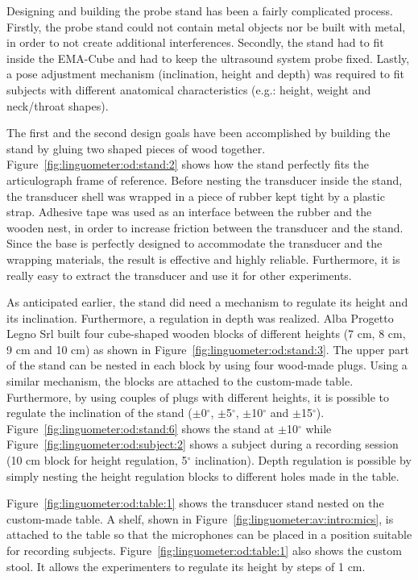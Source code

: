 Designing and building the probe stand has been a fairly complicated process. 
Firstly, the probe stand could not contain metal objects nor be
built with metal, in order to not create additional interferences.
Secondly, the stand had to fit inside the EMA-Cube and had to keep the
ultrasound system probe fixed. 
Lastly, a pose adjustment mechanism 
(inclination, height and depth) was required to
fit subjects with different anatomical characteristics (e.g.: height, weight and
neck/throat shapes).


The first and the second design goals have been accomplished by building the 
stand by gluing two shaped pieces of wood together.
Figure~\ref{fig:linguometer:od:stand:2} shows how the stand perfectly fits the 
articulograph frame of reference. 
Before nesting the transducer inside the stand, the transducer shell was wrapped
in a piece of rubber kept tight by a plastic strap. 
Adhesive tape was used as an interface between the rubber and the
wooden nest, in order to increase friction between the transducer and the
stand.
Since the base is perfectly designed to accommodate the transducer and the
wrapping materials, the result is effective and highly reliable. 
Furthermore, it is really easy to extract the transducer and use it for other
experiments.

As anticipated earlier, the stand did need a mechanism to regulate its height
and its inclination. Furthermore, a regulation in depth was realized.
Alba Progetto Legno Srl built four cube-shaped wooden blocks of different
heights (7 cm, 8 cm, 9 cm and 10 cm) as shown in
Figure~\ref{fig:linguometer:od:stand:3}.
The upper part of the stand can be nested in each block by using four wood-made
plugs.
Using a similar mechanism, the blocks are attached to the custom-made table.
Furthermore, by using couples of plugs with different heights, it is possible to
regulate the inclination of the stand 
($\pm$0$^{\circ}$, $\pm$5$^{\circ}$, $\pm$10$^{\circ}$ and $\pm$15$^{\circ}$).
Figure~\ref{fig:linguometer:od:stand:6} shows the stand at $\pm$10$^{\circ}$
while Figure~\ref{fig:linguometer:od:subject:2} shows a subject during a
recording session (10 cm block for height regulation, 5$^{\circ}$ inclination).
Depth regulation is possible by simply nesting the height regulation blocks to
different holes made in the table.

Figure~\ref{fig:linguometer:od:table:1} shows the transducer stand nested on the
custom-made table. A shelf, shown in Figure~\ref{fig:linguometer:av:intro:mics},
is attached to the table so that the microphones can be placed in a position 
suitable for recording subjects.
Figure~\ref{fig:linguometer:od:table:1} also shows the custom stool. 
It allows the experimenters to regulate its height by steps of 1 cm.

